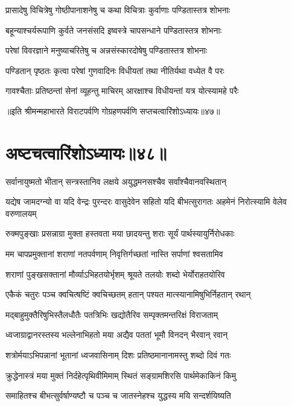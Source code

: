 \twolineshloka
{प्रासादेषु विचित्रेषु गोष्ठीपानाशनेषु च}
{कथा विचित्राः कुर्वाणाः पण्डितास्तत्र शोभनाः}


\twolineshloka
{बहून्याश्चर्यरूपाणि कुर्वते जनसंसदि}
{इष्वस्त्रे चापसन्धाने पण्डितास्तत्र शोभनाः}


\twolineshloka
{परेषां विवरज्ञाने मनुष्याचरितेषु च}
{अन्नसंस्कारदोषेषु पण्डितास्तत्र शोभनाः}


\twolineshloka
{पण्डितान् पृष्ठतः कृत्वा परेषां गुणवादिनः}
{विधीयतां तथा नीतिर्यथा वध्येत वै परः}


\twolineshloka
{गावश्चैताः प्रतिष्ठन्तां सेनां व्यूहन्तु माचिरम्}
{आरक्षाश्च विधीयन्तां यत्र योत्स्यामहे परैः}

॥इति श्रीमन्महाभारते विराटपर्वणि गोग्रहणपर्वणि सप्तचत्वारिंशोऽध्यायः॥४७॥

\chapter{अष्टचत्वारिंशोऽध्यायः॥४८॥}

\twolineshloka
{सर्वानायुष्मतो भीतान् सन्त्रस्तानिव लक्षये}
{अयुद्धमनसश्चैव सर्वांश्चैवानवस्थितान्}


\threelineshloka
{यद्येष जामदग्न्यो वा यदि वेन्द्रः पुरन्दरः}
{वासुदेवेन सहितो यदि बीभत्सुरागतः}
{अहमेनं निरोत्स्यामि वेलेव वरुणालयम्}


\twolineshloka
{रुक्मपुङ्खाः प्रसन्नाग्रा मुक्ता हस्तवता मया}
{छादयन्तु शराः सूर्यं पार्थस्यायुर्निरोधकाः}


\twolineshloka
{मम चापप्रमुक्तानां शराणां नतपर्वणाम्}
{निवृत्तिर्गच्छतां नास्ति सर्पाणां श्वसतामिव}


\twolineshloka
{शराणां पुङ्खसक्तानां मौर्व्याऽभिहतयोर्भृशम्}
{श्रूयते तलयोः शब्दो भेर्योराहतयोरिव}


\twolineshloka
{एकैकं चतुरः पञ्च क्वचित्षष्टिं क्वचिच्छतम्}
{हतान् पश्यत मात्स्यानामिषुभिर्निहतान् रथान्}


\twolineshloka
{मद्बाहुमुक्तैरिषुभिस्तैलधौतैः पतत्रिभिः}
{खद्योतैरिव सम्पृक्तमन्तरिक्षं विराजताम्}


\twolineshloka
{ध्वजाग्राद्वानरस्तस्य भल्लेनाभिहतो मया}
{अद्यैव पततां भूमौ विनदन् भैरवान् रवान्}


\twolineshloka
{शत्रोर्मयाऽभिपन्नानां भूतानां ध्वजवासिनाम्}
{दिशः प्रतिष्ठमानानामस्तु शब्दो दिवं गतः}


\twolineshloka
{क्रुद्धेनास्त्रं मया मुक्तं निर्दहेत्पृथिवीमिमाम्}
{स्थितं सङ्ग्रामशिरसि पार्थमेकाकिनं किमु}


\twolineshloka
{समाहितश्च बीभत्सुर्वर्षाण्यष्टौ च पञ्च च}
{जातस्नेहश्च युद्धस्य मयि सन्दर्शयिष्यति}



